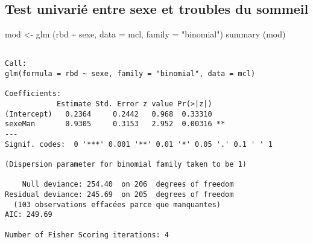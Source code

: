 \documentclass[
  letterpaper,
  DIV=11,
  numbers=noendperiod]{scrartcl}
\newenvironment{Shaded}{\begin{snugshade}}{\end{snugshade}}
\newcommand{\AttributeTok}[1]{\textcolor[rgb]{0.40,0.45,0.13}{#1}}
\newcommand{\DecValTok}[1]{\textcolor[rgb]{0.68,0.00,0.00}{#1}}
\newcommand{\FunctionTok}[1]{\textcolor[rgb]{0.28,0.35,0.67}{#1}}
\newcommand{\NormalTok}[1]{\textcolor[rgb]{0.00,0.23,0.31}{#1}}
\newcommand{\OtherTok}[1]{\textcolor[rgb]{0.00,0.23,0.31}{#1}}
\newcommand{\SpecialCharTok}[1]{\textcolor[rgb]{0.37,0.37,0.37}{#1}}
\newcommand{\StringTok}[1]{\textcolor[rgb]{0.13,0.47,0.30}{#1}}
\begin{document}
\begin{Shaded}
\end{Shaded}

\hypertarget{test-univariuxe9-entre-sexe-et-troubles-du-sommeil}{%
\subsection{Test univarié entre sexe et troubles du
sommeil}\label{test-univariuxe9-entre-sexe-et-troubles-du-sommeil}}

\begin{Shaded}
\begin{Highlighting}[]
\NormalTok{mod }\OtherTok{\textless{}{-}} \FunctionTok{glm}\NormalTok{ (rbd }\SpecialCharTok{\textasciitilde{}}\NormalTok{ sexe, }\AttributeTok{data =}\NormalTok{ mcl, }\AttributeTok{family =} \StringTok{"binomial"}\NormalTok{)}
\FunctionTok{summary}\NormalTok{ (mod)}
\end{Highlighting}
\end{Shaded}

\begin{verbatim}

Call:
glm(formula = rbd ~ sexe, family = "binomial", data = mcl)

Coefficients:
            Estimate Std. Error z value Pr(>|z|)   
(Intercept)   0.2364     0.2442   0.968  0.33310   
sexeMan       0.9305     0.3153   2.952  0.00316 **
---
Signif. codes:  0 '***' 0.001 '**' 0.01 '*' 0.05 '.' 0.1 ' ' 1

(Dispersion parameter for binomial family taken to be 1)

    Null deviance: 254.40  on 206  degrees of freedom
Residual deviance: 245.69  on 205  degrees of freedom
  (103 observations effacées parce que manquantes)
AIC: 249.69

Number of Fisher Scoring iterations: 4
\end{verbatim}
\end{document}
